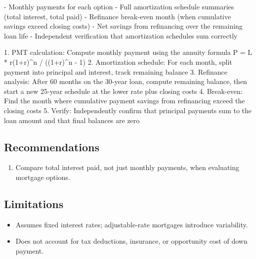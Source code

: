 \documentclass[11pt, a4paper]{article}
\begin{document}
- Monthly payments for each option
- Full amortization schedule summaries (total interest, total paid)
- Refinance break-even month (when cumulative savings exceed closing costs)
- Net savings from refinancing over the remaining loan life
- Independent verification that amortization schedules sum correctly

1. PMT calculation: Compute monthly payment using the annuity formula P = L * r(1+r)\textasciicircum{}n / ((1+r)\textasciicircum{}n - 1)
2. Amortization schedule: For each month, split payment into principal and interest, track remaining balance
3. Refinance analysis: After 60 months on the 30-year loan, compute remaining balance, then start a new 25-year schedule at the lower rate plus closing costs
4. Break-even: Find the month where cumulative payment savings from refinancing exceed the closing costs
5. Verify: Independently confirm that principal payments sum to the loan amount and that final balances are zero



\subsection{Recommendations}

\begin{enumerate}
  \item Compare total interest paid, not just monthly payments, when evaluating mortgage options.
\end{enumerate}

\subsection{Limitations}

\begin{polyawarnbox}
\begin{itemize}
  \item Assumes fixed interest rates; adjustable-rate mortgages introduce variability.
  \item Does not account for tax deductions, insurance, or opportunity cost of down payment.
\end{itemize}
\end{polyawarnbox}

\end{document}
